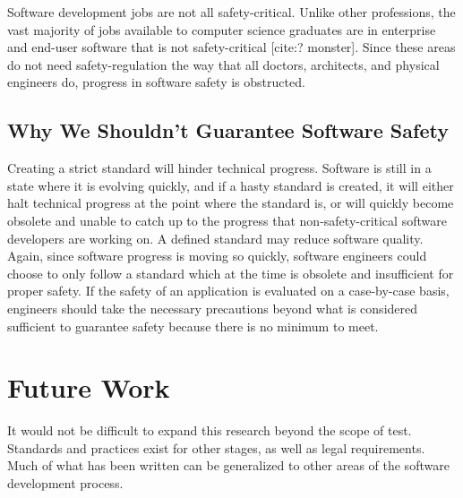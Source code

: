 \documentclass[12pt]{report}
\begin{document}
Software development jobs are not all safety-critical. Unlike other professions, the vast majority of jobs available to computer science graduates are in enterprise and end-user software that is not safety-critical [cite:? monster]. Since these areas do not need safety-regulation the way that all doctors, architects, and physical engineers do, progress in software safety is obstructed. 

\subsection{Why We Shouldn't Guarantee Software Safety} 
Creating a strict standard will hinder technical progress. Software is still in a state where it is evolving quickly, and if a hasty standard is created, it will either halt technical progress at the point where the standard is, or will quickly become obsolete and unable to catch up to the progress that non-safety-critical software developers are working on. 
A defined standard may reduce software quality. Again, since software progress is moving so quickly, software engineers could choose to only follow a standard which at the time is obsolete and insufficient for proper safety. If the safety of an application is evaluated on a case-by-case basis, engineers should take the necessary precautions beyond what is considered sufficient to guarantee safety because there is no minimum to meet. 

\section{Future Work} 

It would not be difficult to expand this research beyond the scope of test. Standards and practices exist for other stages, as well as legal requirements. Much of what has been written can be generalized to other areas of the software development process. 

 
 
\end{document}
